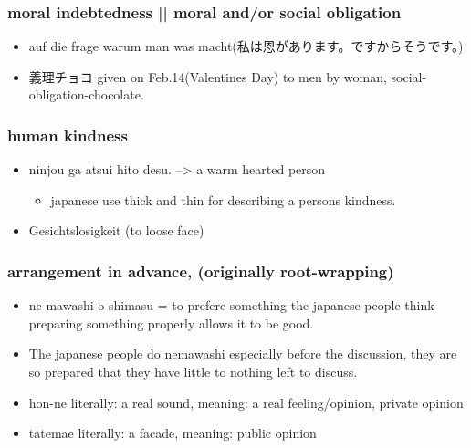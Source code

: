 \documentclass{article}
\newcommand\tabni[1][0.2cm]{\hspace*{#1}}
\begin{document}
\subsubsection{ \tabni moral indebtedness ||  \tabni moral and/or social obligation}
\begin{itemize}%
\item auf die frage warum man was macht(私は恩があります。ですからそうです。) \\
\end{itemize}
\begin{itemize}%
\item 義理チョコ given on Feb.14(Valentines Day) to men by woman, social-obligation-chocolate. \\
\end{itemize}
\subsubsection{ \tabni human kindness}
\begin{itemize}%
\item ninjou ga atsui hito desu. --> a warm hearted person
\begin{itemize}%
\item japanese use thick and thin for describing a persons kindness.
\end{itemize}
\item {} Gesichtslosigkeit (to loose face)\\ %
\end{itemize}
\subsubsection{ \tabni arrangement in advance, (originally root-wrapping)}
\begin{itemize}%
\item ne-mawashi o shimasu = to prefere something the japanese people think preparing something properly allows it to be good. 
\item The japanese people do nemawashi especially before the discussion, they are so prepared that they have little to nothing left to discuss.
\end{itemize}
\begin{itemize}%
\item hon-ne literally: a real sound, meaning: a real feeling/opinion, private opinion
\item tatemae literally: a facade, meaning: public opinion \\
\end{itemize}
\end{document}
